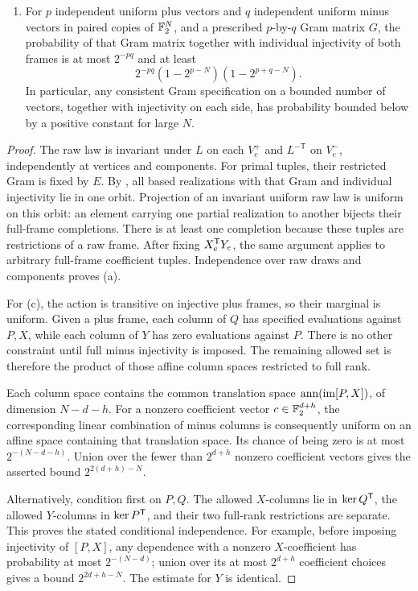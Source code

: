 \begin{lemma}
\begin{enumerate}[label=\textup{(\alph*)}]
\item
For \(p\) independent uniform plus vectors and \(q\) independent uniform minus vectors in paired copies of \(\mathbb F_2^N\), and a prescribed \(p\)-by-\(q\) Gram matrix \(G\), the probability of that Gram matrix together with individual injectivity of both frames is at most \(2^{-pq}\) and at least
\begin{equation}\label{eq:bounded-gram-normalization}
 2^{-pq}(1-2^{p-N})(1-2^{p+q-N}).
\end{equation}
In particular, any consistent Gram specification on a bounded number of vectors, together with injectivity on each side, has probability bounded below by a positive constant for large \(N\).
\end{enumerate}
\end{lemma}
\begin{proof}
The raw law is invariant under \(L\) on each \(V_e^+\) and \(L^{-\mathsf T}\) on \(V_e^-\), independently at vertices and components.
For primal tuples, their restricted Gram is fixed by \(E\).
By , all based realizations with that Gram and individual injectivity lie in one orbit.
Projection of an invariant uniform raw law is uniform on this orbit: an element carrying one partial realization to another bijects their full-frame completions.
There is at least one completion because these tuples are restrictions of a raw frame.
After fixing \(X_e^{\mathsf T} Y_e\), the same argument applies to arbitrary full-frame coefficient tuples.
Independence over raw draws and components proves (a).

For (c), the action is transitive on injective plus frames, so their marginal is uniform.
Given a plus frame, each column of \(Q\) has specified evaluations against \(P,X\), while each column of \(Y\) has zero evaluations against \(P\).
There is no other constraint until full minus injectivity is imposed.
The remaining allowed set is therefore the product of those affine column spaces restricted to full rank.

Each column space contains the common translation space
\(\operatorname{ann}(\operatorname{im}[P,X])\), of dimension \(N-d-h\).
For a nonzero coefficient vector \(c\in\mathbb F_2^{d+h}\), the corresponding linear combination of minus columns is consequently uniform on an affine space containing that translation space.
Its chance of being zero is at most \(2^{-(N-d-h)}\).
Union over the fewer than \(2^{d+h}\) nonzero coefficient vectors gives the asserted bound \(2^{2(d+h)-N}\).

Alternatively, condition first on \(P,Q\).
The allowed \(X\)-columns lie in \(\ker Q^{\mathsf T}\), the allowed \(Y\)-columns in \(\ker P^{\mathsf T}\), and their two full-rank restrictions are separate.
This proves the stated conditional independence.
For example, before imposing injectivity of \([P,X]\), any dependence with a nonzero \(X\)-coefficient has probability at most \(2^{-(N-d)}\); union over its at most \(2^{d+h}\) coefficient choices gives a bound \(2^{2d+h-N}\).
The estimate for \(Y\) is identical.


\end{proof}
